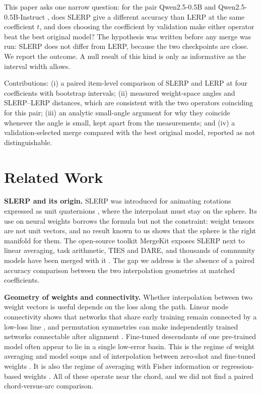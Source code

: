 \documentclass[conference]{IEEEtran}
\begin{document}
This paper asks one narrow question: for the pair Qwen2.5-0.5B and Qwen2.5-0.5B-Instruct \cite{qwen25}, does SLERP give a different accuracy than LERP at the same coefficient $t$, and does choosing the coefficient by validation make either operator beat the best original model? The hypothesis was written before any merge was run: SLERP does not differ from LERP, because the two checkpoints are close. We report the outcome. A null result of this kind is only as informative as the interval width allows.

Contributions: (i) a paired item-level comparison of SLERP and LERP at four coefficients with bootstrap intervals; (ii) measured weight-space angles and SLERP--LERP distances, which are consistent with the two operators coinciding for this pair; (iii) an analytic small-angle argument for why they coincide whenever the angle is small, kept apart from the measurements; and (iv) a validation-selected merge compared with the best original model, reported as not distinguishable.

\section{Related Work}
\textbf{SLERP and its origin.} SLERP was introduced for animating rotations expressed as unit quaternions \cite{shoemake1985slerp}, where the interpolant must stay on the sphere. Its use on neural weights borrows the formula but not the constraint: weight tensors are not unit vectors, and no result known to us shows that the sphere is the right manifold for them. The open-source toolkit MergeKit exposes SLERP next to linear averaging, task arithmetic, TIES and DARE, and thousands of community models have been merged with it \cite{goddard2024mergekit}. The gap we address is the absence of a paired accuracy comparison between the two interpolation geometries at matched coefficients.

\textbf{Geometry of weights and connectivity.} Whether interpolation between two weight vectors is useful depends on the loss along the path. Linear mode connectivity shows that networks that share early training remain connected by a low-loss line \cite{frankle2020lmc}, and permutation symmetries can make independently trained networks connectable after alignment \cite{ainsworth2022rebasin}. Fine-tuned descendants of one pre-trained model often appear to lie in a single low-error basin. This is the regime of weight averaging and model soups \cite{wortsman2022soups} and of interpolation between zero-shot and fine-tuned weights \cite{wortsman2022wiseft}. It is also the regime of averaging with Fisher information or regression-based weights \cite{matena2021fisher,jin2022dataless}. All of these operate near the chord, and we did not find a paired chord-versus-arc comparison.
\end{document}
